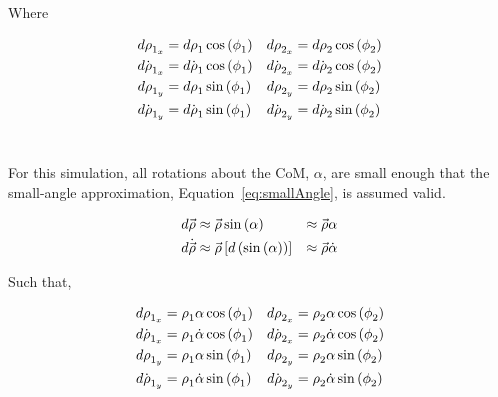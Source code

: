 Where

\begin{equation}
\centering
	\begin{aligned}
	d\rho_{1_x} &= d\rho_1\cos\left( \phi_1 \right) & d\rho_{2_x} &= d\rho_2\cos\left( \phi_2 \right)\\
	d\dot{\rho}_{1_x} &= d\dot{\rho}_1\cos\left( \phi_1 \right) & d\dot{\rho}_{2_x} &= d\dot{\rho}_2\cos\left(\phi_2\right)\\
	d\rho_{1_y} &= d\rho_1\sin\left( \phi_1 \right) & d\rho_{2_y} &= d\rho_2\sin\left( \phi_2 \right)\\
	d\dot{\rho}_{1_y} &= d\dot{\rho}_1\sin\left( \phi_1 \right) & d\dot{\rho}_{2_y} &= d\dot{\rho}_2\sin\left(\phi_2\right)	
	\label{eq:drho}
	\end{aligned}
\end{equation}\

 For this simulation, all rotations about the CoM, $\alpha$, are small enough that the small-angle approximation, Equation~\eqref{eq:smallAngle}, is assumed valid.

\begin{equation}
\centering
	\begin{aligned}
	d\vec{\rho} &\approx \vec{\rho}\sin \left(\alpha\right) &\approx \vec{\rho}\alpha \\
	d\dot{\vec{\rho}} &\approx \vec{\rho} \left[d\left(\sin \left(\alpha\right)\right)\right] &\approx  \vec{\rho}\dot{\alpha}
	\label{eq:smallAngle}
	\end{aligned}
\end{equation}

Such that,

\begin{equation}
\centering
	\begin{aligned}
	d\rho_{1_x} &= \rho_1\alpha\cos\left( \phi_1 \right) & d\rho_{2_x} &= \rho_2\alpha\cos\left( \phi_2 \right)\\
	d\dot{\rho}_{1_x} &= \rho_1\dot{\alpha}\cos\left( \phi_1 \right) & d\dot{\rho}_{2_x} &= \rho_2\dot{\alpha}\cos\left( \phi_2 \right)\\
	d\rho_{1_y} &= \rho_1\alpha\sin\left( \phi_1 \right) & d\rho_{2_y} &= \rho_2\alpha\sin\left( \phi_2 \right)\\
	d\dot{\rho}_{1_y} &= \rho_1\dot{\alpha}\sin\left( \phi_1 \right) & d\dot{\rho}_{2_y} &= \rho_2\dot{\alpha}\sin\left( \phi_2 \right)
	\label{eq:drho}
	\end{aligned}
\end{equation}


